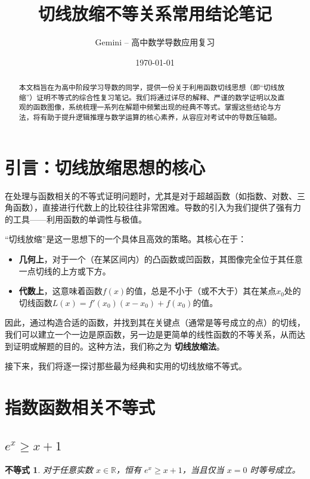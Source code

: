 \documentclass[a4paper,12pt]{ctexart}
\title{\textcolor{MyBlue}{\Huge{\textbf{切线放缩不等关系常用结论笔记}}}}
\author{\textcolor{MyGray}{Gemini -- 高中数学导数应用复习}}
\date{\today}
\theoremstyle{mytheoremstyle}
\newtheorem{theorem}{不等式}
\begin{document}
\maketitle

\begin{abstract}
\noindent
本文档旨在为高中阶段学习导数的同学，提供一份关于利用函数切线思想（即“切线放缩”）证明不等式的综合性复习笔记。我们将通过详尽的解释、严谨的数学证明以及直观的函数图像，系统梳理一系列在解题中频繁出现的经典不等式。掌握这些结论与方法，将有助于提升逻辑推理与数学运算的核心素养，从容应对考试中的导数压轴题。
\end{abstract}

\tableofcontents
\newpage

\section{\textcolor{MyBlue}{引言：切线放缩思想的核心}}

在处理与函数相关的不等式证明问题时，尤其是对于超越函数（如指数、对数、三角函数），直接进行代数上的比较往往非常困难。导数的引入为我们提供了强有力的工具——利用函数的单调性与极值。

“切线放缩”是这一思想下的一个具体且高效的策略。其核心在于：
\begin{itemize}
    \item \textbf{几何上}，对于一个（在某区间内）的凸函数或凹函数，其图像完全位于其任意一点切线的上方或下方。
    \item \textbf{代数上}，这意味着函数$f(x)$的值，总是不小于（或不大于）其在某点$x_0$处的切线函数$L(x) = f'(x_0)(x-x_0) + f(x_0)$的值。
\end{itemize}
因此，通过构造合适的函数，并找到其在关键点（通常是等号成立的点）的切线，我们可以建立一个一边是原函数，另一边是更简单的线性函数的不等关系，从而达到证明或解题的目的。这种方法，我们称之为 \textbf{\textcolor{MyRed}{切线放缩法}}。

接下来，我们将逐一探讨那些最为经典和实用的切线放缩不等式。

\newpage
\section{\textcolor{MyBlue}{指数函数相关不等式}}


\subsection{\textcolor{MyPurple}{$e^x \ge x+1$}}

\begin{theorem}
对于任意实数 $x \in \mathbb{R}$，恒有 $e^x \ge x+1$，当且仅当 $x=0$ 时等号成立。
\end{theorem}
\end{document}
